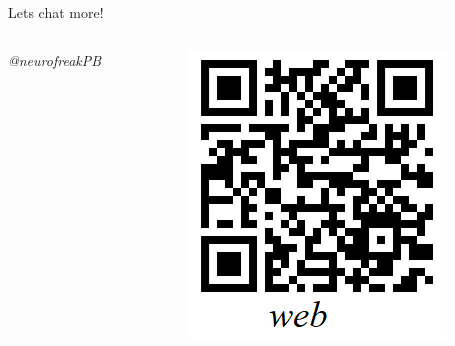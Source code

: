 \documentclass[final,12pt]{beamer}
\begin{document}
\begin{frame}[t]
\begin{columns}[t]
\begin{column}{\halfpagecol}
\begin{bluebox}{{\small Lets chat more!}}
\begin{columns}
    \begin{column}{0.56\linewidth}
         \begin{description}
        \item {\small\textit{@neurofreakPB}}
         \item {\small{}}
    \end{description}
    \end{column}
    
    \begin{column}{0.20\linewidth}
          \includegraphics[scale=0.5]{images/siteqrcode}
    \end{column}
    \end{columns}
    \end{bluebox}
    
  \end{column}
  
\end{columns} 

\end{frame}
\end{document}
